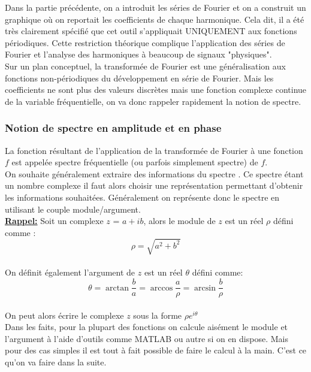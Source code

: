 \documentclass[11pt,a4paper]{article}
\begin{document}
Dans la partie précédente, on a introduit les séries de Fourier et on a construit un graphique où on reportait les coefficients de chaque harmonique. Cela dit, il a été très clairement spécifié que cet outil s'appliquait UNIQUEMENT aux fonctions périodiques. Cette restriction théorique complique l'application des séries de Fourier et l'analyse des harmoniques à beaucoup de signaux "physiques".\\

Sur un plan conceptuel, la transformée de Fourier est une généralisation aux fonctions non-périodiques du développement en série de Fourier. Mais les coefficients ne sont plus des valeurs discrètes mais une fonction complexe continue de la variable fréquentielle, on va donc rappeler rapidement la notion de spectre.\\

\subsubsection{Notion de spectre en amplitude et en phase}
La fonction résultant de l'application de la transformée de Fourier à une fonction $f$ est appelée spectre fréquentielle (ou parfois simplement spectre) de $f$.\\

On souhaite généralement extraire des informations du spectre . Ce spectre étant un nombre complexe il faut alors choisir une représentation permettant d'obtenir les informations souhaitées. Généralement on représente donc le spectre en utilisant le couple module/argument.\\

\underline{\textbf{Rappel:}} Soit un complexe $z$ = $a + ib$, alors le module de $z$ est un réel $\rho$ défini comme :\\

\[ \rho = \sqrt{a^2 + b^2}  \]\\

On définit également l'argument de $z$ est un réel $\theta$ défini comme:\\

\[ \theta =  \arctan\frac{b}{a} = \arccos{\frac{a}{\rho}} = \arcsin{\frac{b}{\rho}} \] \\

On peut alors écrire le complexe $z$ sous la forme $\rho e^{i \theta}$\\

Dans les faits, pour la plupart des fonctions on calcule aisément le module et l'argument à l'aide d'outils comme MATLAB ou autre si on en dispose. Mais pour des cas simples il est tout à fait possible de faire le calcul à la main. C'est ce qu'on va faire dans la suite.\\
\end{document}
